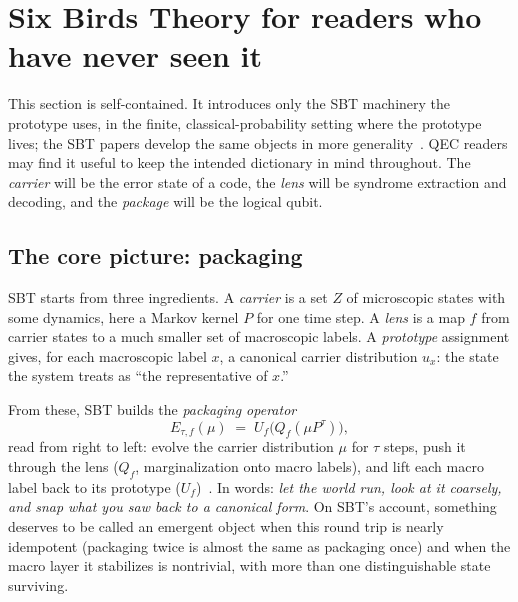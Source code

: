 \section{Six Birds Theory for readers who have never seen it}
\label{sec:sbt}

This section is self-contained. It introduces only the SBT machinery the prototype uses, in the finite, classical-probability setting where the prototype lives; the SBT papers develop the same objects in more generality~\cite{sbt-f1,sbt-f3}. QEC readers may find it useful to keep the intended dictionary in mind throughout. The \emph{carrier} will be the error state of a code, the \emph{lens} will be syndrome extraction and decoding, and the \emph{package} will be the logical qubit.

\subsection{The core picture: packaging}
\label{sec:sbt-packaging}

SBT starts from three ingredients. A \emph{carrier} is a set $Z$ of microscopic states with some dynamics, here a Markov kernel $P$ for one time step. A \emph{lens} is a map $f$ from carrier states to a much smaller set of macroscopic labels. A \emph{prototype} assignment gives, for each macroscopic label $x$, a canonical carrier distribution $u_x$: the state the system treats as ``the representative of $x$.''

From these, SBT builds the \emph{packaging operator}
\begin{equation}
E_{\tau,f}(\mu) \;=\; U_f\!\bigl(Q_f(\mu P^{\tau})\bigr),
\label{eq:packaging}
\end{equation}
read from right to left: evolve the carrier distribution $\mu$ for $\tau$ steps, push it through the lens ($Q_f$, marginalization onto macro labels), and lift each macro label back to its prototype ($U_f$)~\cite{sbt-f1}. In words: \emph{let the world run, look at it coarsely, and snap what you saw back to a canonical form}. On SBT's account, something deserves to be called an emergent object when this round trip is nearly idempotent (packaging twice is almost the same as packaging once) and when the macro layer it stabilizes is nontrivial, with more than one distinguishable state surviving.

